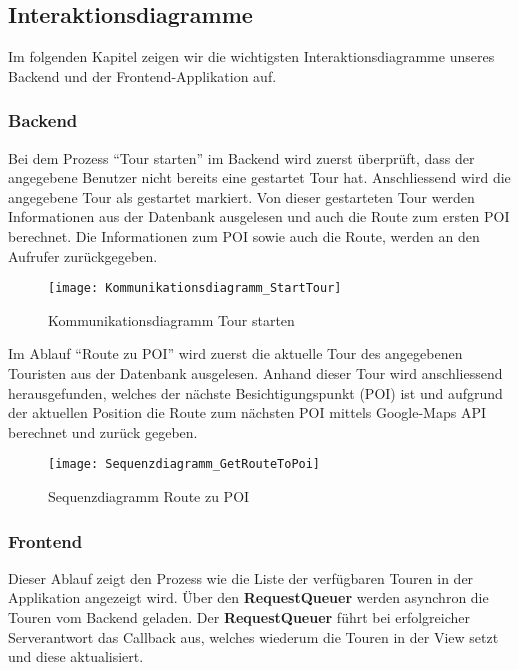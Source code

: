 \subsection{Interaktionsdiagramme}\label{interaktionsdiagramme}
Im folgenden Kapitel zeigen wir die wichtigsten Interaktionsdiagramme unseres Backend und der Frontend-Applikation auf.

\subsubsection{Backend}\label{backend}

Bei dem Prozess ``Tour starten'' im Backend wird zuerst überprüft, dass der angegebene Benutzer nicht bereits eine gestartet Tour hat. Anschliessend wird die angegebene Tour als gestartet markiert. Von dieser gestarteten Tour werden Informationen aus der Datenbank ausgelesen und auch die Route zum ersten POI berechnet. Die Informationen zum POI sowie auch die Route, werden an den Aufrufer zurückgegeben.

\begin{figure}
  \centering
  \texttt{[image: Kommunikationsdiagramm\_StartTour]}
  \caption{Kommunikationsdiagramm Tour starten}
\end{figure}

Im Ablauf ``Route zu POI'' wird zuerst die aktuelle Tour des angegebenen Touristen aus der
Datenbank ausgelesen. Anhand dieser Tour wird anschliessend herausgefunden, welches der nächste
Besichtigungspunkt (POI) ist und aufgrund der aktuellen Position die Route zum nächsten
POI mittels Google-Maps API berechnet und zurück gegeben.

\begin{figure}
  \centering
  \texttt{[image: Sequenzdiagramm\_GetRouteToPoi]}
  \caption{Sequenzdiagramm Route zu POI}
\end{figure}

\subsubsection{Frontend}\label{frontend}
\label{frontend-listactivity}
Dieser Ablauf zeigt den Prozess wie die Liste der verfügbaren Touren in der Applikation
angezeigt wird. Über den \textbf{RequestQueuer} werden asynchron die Touren vom Backend geladen.
Der \textbf{RequestQueuer} führt bei erfolgreicher Serverantwort das Callback aus, welches
wiederum die Touren in der View setzt und diese aktualisiert.

